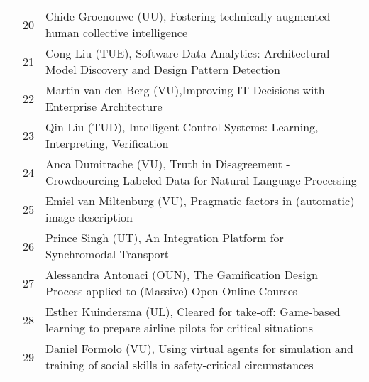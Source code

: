 \begin{longtabu}{@{}l@{ }l@{\hspace{1em}}X}
	&	 20	&	 Chide Groenouwe (UU), Fostering technically augmented human collective intelligence \\
	&	 21	&	 Cong Liu (TUE), Software Data Analytics: Architectural Model Discovery and Design Pattern Detection \\
	&	 22	&	 Martin van den Berg (VU),Improving IT Decisions with Enterprise Architecture \\
	&	 23	&	 Qin Liu (TUD), Intelligent Control Systems: Learning, Interpreting, Verification\\
	&	 24	&	 Anca Dumitrache (VU),  Truth in Disagreement - Crowdsourcing Labeled Data for Natural Language Processing\\
	&	 25	&	 Emiel van Miltenburg (VU), Pragmatic factors in (automatic) image description \\
	&	 26	&	 Prince Singh (UT), An Integration Platform for Synchromodal Transport \\
	&	 27	&	 Alessandra Antonaci (OUN), The Gamification Design Process applied to (Massive) Open Online Courses\\
	&	 28	&	 Esther Kuindersma (UL), Cleared for take-off: Game-based learning to prepare airline pilots for critical situations \\
	&	 29	&	 Daniel Formolo (VU), Using virtual agents for simulation and training of social skills in safety-critical circumstances \\




\bottomrule
\end{longtabu}


